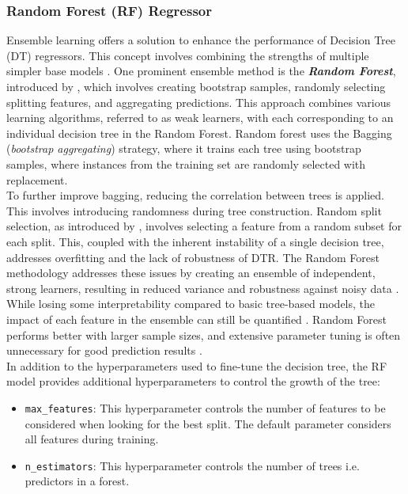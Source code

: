 \documentclass[]{interact}
\theoremstyle{plain}%
\theoremstyle{definition}
\theoremstyle{remark}
\begin{document}
\subsubsection{Random Forest (RF) Regressor}\label{sec:rf_theo_j}

Ensemble learning offers a solution to enhance the performance of Decision Tree (DT) regressors. This concept involves combining the strengths of multiple simpler base models \citep{Hastie.2009}. One prominent ensemble method is the \textbf{\emph{Random Forest}}, introduced by \citet{Breiman.2001}, which involves creating bootstrap samples, randomly selecting splitting features, and aggregating predictions. This approach combines various learning algorithms, referred to as weak learners, with each corresponding to an individual decision tree in the Random Forest. Random forest uses the Bagging (\emph{bootstrap aggregating}) strategy, where it trains each tree using bootstrap samples, where instances from the training set are randomly selected with replacement.\\ 

To further improve bagging, reducing the correlation between trees is applied. This involves introducing randomness during tree construction. Random split selection, as introduced by \citet{Dietterich.2000}, involves selecting a feature from a random subset for each split. This, coupled with the inherent instability of a single decision tree, addresses overfitting and the lack of robustness of DTR. The Random Forest methodology addresses these issues by creating an ensemble of independent, strong learners, resulting in reduced variance and robustness against noisy data \citep{Breiman.2001}. While losing some interpretability compared to basic tree-based models, the impact of each feature in the ensemble can still be quantified \citep{Kuhn.2013}. Random Forest performs better with larger sample sizes, and extensive parameter tuning is often unnecessary for good prediction results \citep{Kuhn.2013, Hastie.2009}.\\

In addition to the hyperparameters used to fine-tune the decision tree, the RF model provides additional hyperparameters to control the growth of the tree:

\begin{itemize}
  \item \texttt{max\_features}: This hyperparameter controls the number of features to be considered when looking for the best split. The default parameter considers all features during training.
  \item \texttt{n\_estimators}: This hyperparameter controls the number of trees i.e. predictors in a forest.
\end{itemize}
\end{document}
